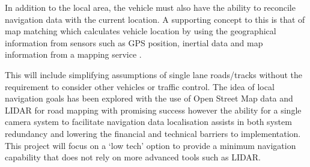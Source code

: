 \documentclass[]{aiaa-tc}%
\begin{document}
In addition to the local area, the vehicle must also have the ability to reconcile navigation data with the current location. A supporting concept to this is that of map matching which calculates vehicle location by using the geographical information from sensors such as GPS position, inertial data and map information from a mapping service \citep{keyTechSelfDriving}. 

This will include simplifying assumptions of single lane roads/tracks without the requirement to consider other vehicles or traffic control. The idea of local navigation goals has been explored with the use of Open Street Map data and LIDAR for road mapping with promising success \citep{mitLocalNavDriving} however the ability for a single camera system to facilitate navigation data localisation assists in both system redundancy and lowering the financial and technical barriers to implementation. This project will focus on a `low tech' option to provide a minimum navigation capability that does not rely on more advanced tools such as LIDAR. 
% 
%
%
\end{document}

